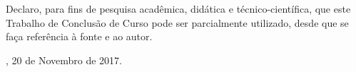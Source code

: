 \begin{declaracaodoautor}

  \vspace*{1.5cm}

  Declaro, para fins de pesquisa acadêmica, didática e
  técnico-científica, que este Trabalho de Conclusão de Curso pode ser
  parcialmente utilizado, desde que se faça referência à fonte e ao
  autor.

  \vspace*{2.5cm}

  \centering

  \imprimirlocal, 20 de Novembro de 2017.

  \vspace*{2.5cm}

  \imprimirautor

  \vspace*{\fill}
  
\end{declaracaodoautor}
